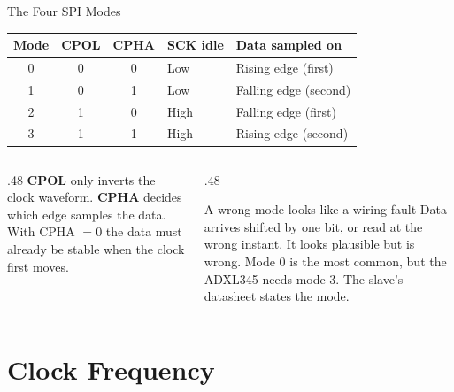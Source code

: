 \documentclass[9pt,aspectratio=169,xcolor=table]{beamer}
\begin{document}
\begin{frame}{The Four SPI Modes}
    \begin{center}
    {\small
    \striped
    \begin{tabular}{@{}c c c l l@{}}
        \toprule
        \textbf{Mode} & \textbf{CPOL} & \textbf{CPHA} & \textbf{SCK idle} & \textbf{Data sampled on} \\
        \midrule
        0 & 0 & 0 & Low  & Rising edge (first) \\
        1 & 0 & 1 & Low  & Falling edge (second) \\
        2 & 1 & 0 & High & Falling edge (first) \\
        3 & 1 & 1 & High & Rising edge (second) \\
        \bottomrule
    \end{tabular}}
    \end{center}

    \vspace{3mm}
    \begin{columns}[T]
    \begin{column}{.48\textwidth}
        {\small \textbf{CPOL} only inverts the clock waveform. \textbf{CPHA} decides which edge samples the data. With CPHA $=0$ the data must already be stable when the clock first moves.}
    \end{column}
    \begin{column}{.48\textwidth}
        \begin{block}{A wrong mode looks like a wiring fault}
            {\small Data arrives shifted by one bit, or read at the wrong instant. It looks plausible but is wrong. \alert{Mode 0 is the most common}, but the ADXL345 needs mode 3. The slave's datasheet states the mode.}
        \end{block}
    \end{column}
    \end{columns}
\end{frame}


\section{Clock Frequency}
\end{document}
